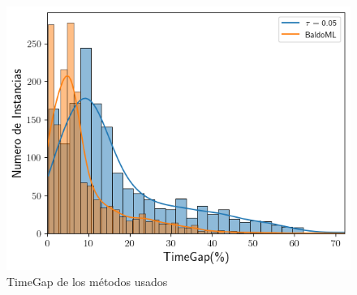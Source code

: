 \documentclass[spanish, a4paper, 12pt, openany,final]{book}
\begin{document}
\begin{figure}[H]
	\centering
	\includegraphics[scale=0.7]{graphs/full_timegap_comparison.png}
	\caption{TimeGap de los métodos usados}
	\label{fig:full_timegap}
\end{figure}
\end{document}
